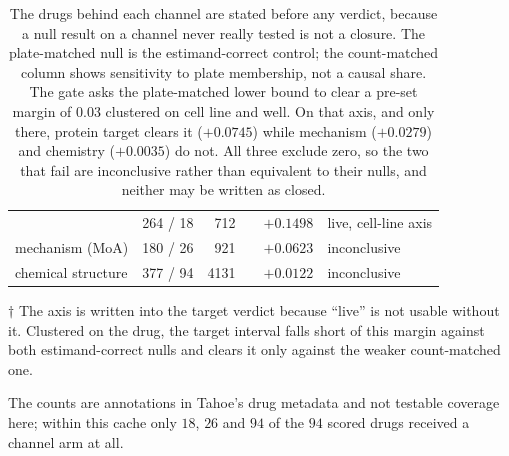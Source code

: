 \begin{table}[htbp]
\caption{ The drugs behind each channel are
stated before any verdict, because a null result on a channel never really tested
is not a closure. The plate-matched null is the estimand-correct control; the
count-matched column shows sensitivity to plate membership, not a causal share.
The gate asks the plate-matched lower bound to clear a pre-set margin of $0.03$
clustered on cell line and well. On that axis, and only there, protein target
clears it ($+0.0745$) while mechanism ($+0.0279$) and chemistry ($+0.0035$) do
not. All three exclude zero, so the two that fail are inconclusive rather than
equivalent to their nulls, and neither may be written as closed.}
\label{tab:channels}
\begin{fullwidth}
\begin{threeparttable}
\begin{tabularx}{\linewidth}{@{}l r r l r Y@{}}
 &  & 
  &  & 
  &  \\
\midrule
{} & 264 / 18 & 712 & 
  & $+0.1498$ & live, cell-line axis\tnote{$\dagger$} \\
mechanism (MoA) & 180 / 26 & 921 & 
  & $+0.0623$ & inconclusive \\
chemical structure & 377 / 94 & \num{4131}
  &  & $+0.0122$ & inconclusive \\
\end{tabularx}
\begin{tablenotes}
\item[$\dagger$] The axis is written into the target verdict because ``live'' is
not usable without it. Clustered on the drug, the target interval falls short of
this margin against both estimand-correct nulls and clears it only against the
weaker count-matched one.
\item The counts are annotations in Tahoe's drug metadata and not testable
coverage here; within this cache only $18$, $26$ and $94$ of the $94$ scored
drugs received a channel arm at all.
\end{tablenotes}
\end{threeparttable}
\end{fullwidth}
\end{table}

